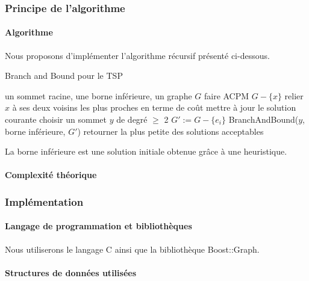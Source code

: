 \documentclass[a4paper, 12pt]{article}
\begin{document}
\subsubsection{Principe de l'algorithme}

\paragraph{Algorithme}

Nous proposons d'implémenter l'algorithme récursif présenté ci-dessous.

\begin{algorithm}[!ht]
\caption{Branch and Bound pour le TSP}
\label{BBtsp}
\begin{algorithmic}[1]
\REQUIRE un sommet racine, une borne inférieure, un graphe $G$
\STATE faire ACPM $G - \{x \}$
\STATE relier $x$ à ses deux voisins les plus proches en terme de coût
\STATE mettre à jour le solution courante
\ELSE
\STATE choisir un sommet $y$ de degré $\geq$ 2
\STATE $G' := G - \{ e_i \}$
\STATE BranchAndBound($y$, borne inférieure, $G'$)
\ENDFOR
\ENDIF
\ENDIF
\STATE retourner la plus petite des solutions acceptables
\end{algorithmic}
\end{algorithm}

La borne inférieure est une solution initiale obtenue grâce à une heuristique.

\paragraph{Complexité théorique}

\subsubsection{Implémentation}

\paragraph{Langage de programmation et bibliothèques}

Nous utiliserons le langage C ainsi que la bibliothèque Boost::Graph.

\paragraph{Structures de données utilisées}
\end{document}
